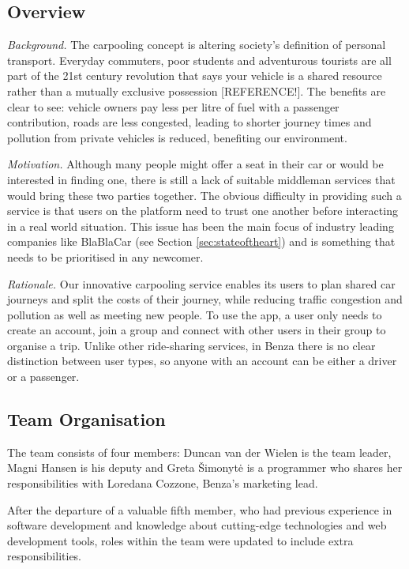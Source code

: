 \documentclass{article}
\begin{document}
    \subsection{Overview}
    \emph{Background.} The carpooling concept is altering society's definition of personal transport. Everyday commuters, poor students and adventurous tourists are all part of the 21st century revolution that says your vehicle is a shared resource rather than a mutually exclusive possession [REFERENCE!]. The benefits are clear to see: vehicle owners pay less per litre of fuel with a passenger contribution, roads are less congested, leading to shorter journey times and pollution from private vehicles is reduced, benefiting our environment. \par
    
    \emph{Motivation.} Although many people might offer a seat in their car or would be interested in finding one, there is still a lack of suitable middleman services that would bring these two parties together. The obvious difficulty in providing such a service is that users on the platform need to trust one another before interacting in a real world situation. This issue has been the main focus of industry leading companies like BlaBlaCar (see Section \ref{sec:stateoftheart}) and is something that needs to be prioritised in any newcomer. \par
    
    \emph{Rationale.} Our innovative carpooling service enables its users to plan shared car journeys and split the costs of their journey, while reducing traffic congestion and pollution as well as meeting new people. To use the \gls{app}, a user only needs to create an account, join a group and connect with other users in their group to organise a trip. Unlike other ride-sharing services, in Benza there is no clear distinction between user types, so anyone with an account can be either a driver or a passenger.\par
    
    \subsection{Team Organisation}
    The team consists of four members: Duncan van der Wielen is the team leader, Magni Hansen is his deputy and Greta Šimonytė is a programmer who shares her responsibilities with Loredana Cozzone, Benza's marketing lead. \par 
 
    After the departure of a valuable fifth member, who had previous experience in software development and knowledge about cutting-edge technologies and web development tools, roles within the team were updated to include extra responsibilities. \par
    
\end{document}
